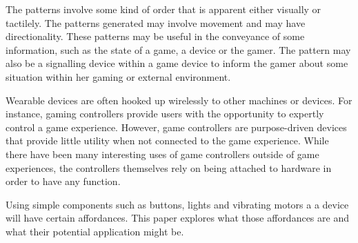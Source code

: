 \documentclass{chi-ext}
\begin{document}
The patterns involve some kind of order that is apparent either visually or tactilely. The patterns generated may involve movement and may have directionality. These patterns may be useful in the conveyance of some information, such as the state of a game, a device or the gamer. The pattern may also be a signalling device within a game device to inform the gamer about some situation within her gaming or external environment.

Wearable devices are often hooked up wirelessly to other machines or devices. For instance, gaming controllers provide users with the opportunity to expertly control a game experience. However, game controllers are purpose-driven devices that provide little utility when not connected to the game experience. While there have been many interesting uses of game controllers outside of game experiences, the controllers themselves rely on being attached to hardware in order to have any function. 


Using simple components such as buttons, lights and vibrating motors a a device will have certain affordances. This paper explores what those affordances are and what their potential application might be. 


\end{document}
